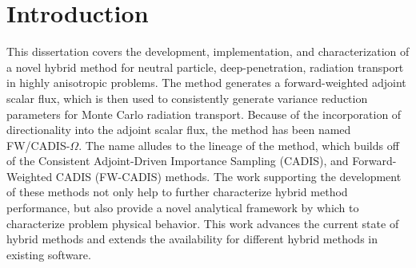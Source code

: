\chapter{Introduction}
\label{ch:introduction}

This dissertation covers the development,
implementation, and characterization
of a novel hybrid method for neutral particle, deep-penetration, radiation transport in
highly anisotropic problems. The method generates a forward-weighted adjoint
scalar flux, which is then used to consistently generate variance reduction
parameters for Monte Carlo radiation transport. Because of the incorporation
of directionality into the adjoint scalar flux,
the method has been named FW/CADIS-$\Omega$. The name alludes to the lineage of
the method, which builds off of
the Consistent Adjoint-Driven Importance Sampling (CADIS), and
Forward-Weighted CADIS (FW-CADIS) methods.
The work supporting the development of these methods not only help
to further characterize hybrid method performance, but also provide a novel
analytical framework by which to characterize problem physical behavior. This
work advances the current state of hybrid methods and extends the availability
for different hybrid methods in existing software.




% 



